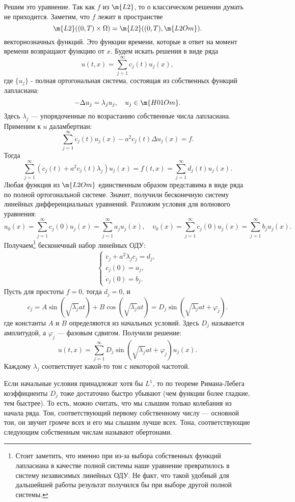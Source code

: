 Решим это уравнение. Так как $f$ из $\m{L2}$, то о классическом решении думать не приходится. Заметим, что $f$ лежит в пространстве
$$ \m{L2}((0,T) \times \Omega) = \m{L2}((0,T) , \m{L2Om}).$$
векторнозначных функций. Это функции времени, которые в ответ на момент времени возвращают функцию от $x$. Будем искать решения в виде ряда
$$ u(t,x) = \sum_{j=1}^\infty c_j (t) u_j(x),$$
где $\{ u_j \}$ - полная ортогональная система, состоящая из собственных функций лапласиана:
$$ - \Delta u_j = \lambda_j u_j, \quad u_j \in \m{H01Om}.$$
Здесь ${\lambda_j}$ --- упорядоченные по возрастанию собственные числа лапласиана. Применим к $u$ даламбертиан:
$$ \sum_{j=1}^\infty \ddot{c}_j(t) u_j(x) - a^2 c_j(t) \Delta u_j(x) = f.$$
Тогда
$$ \sum_{j=1}^\infty \left( \ddot{c}_j(t) + a^2 c_j(t) \lambda_j \right) u_j(x) = f (t,x) = \sum_{j=1}^\infty d_j(t) u_j(x).$$
Любая функция из $\m{L2Om}$ единственным образом представима в виде ряда по полной ортогональной системе. Значит, получили бесконечную систему линейных дифференциальных уравнений. Разложим условия для волнового уравнения:
$$ u_0(x) = \sum_{j=1}^\infty c_j(0) u_j(x) = \sum_{j=1}^\infty a_j u_j(x), \quad  v_0(x) = \sum_{j=1}^\infty \dot{c}_j(0) u_j(x) = \sum_{j=1}^\infty b_j u_j(x).$$
Получаем\footnote{Стоит заметить, что именно при из-за выбора собственных функций лапласиана в качестве полной системы наше уравнение превратилось в систему независимых линейных ОДУ. Не факт, что такой удобный для дальшейшей работы результат получился бы при выборе другой полной системы.} бесконечный набор линейных ОДУ: 
\begin{align*}
	\begin{cases*}
		\ddot{c}_j + a^2 \lambda_j c_j = d_j,\\
		c_j(0) = a_j,\\
		\dot{c}_j(0) = b_j.
	\end{cases*}
\end{align*}
Пусть для простоты $f = 0$, тогда $d_j = 0$, и
$$ c_j = A \sin (\sqrt{\lambda_j} a t) + B \cos (\sqrt{\lambda_j} a t) = D_j \sin (\sqrt{\lambda_j} at + \varphi_j).$$
где константы $A$ и $B$ определяются из начальных условий. Здесь $D_j$ называется амплитудой, а $\varphi_j$ --- фазовым сдвигом. Получили решение:
$$ u (t,x) = \sum_{j=1}^\infty D_j \sin (\sqrt{\lambda_j} at + \varphi_j) u_j(x).$$
Каждому $\lambda_j$ соответствует какой-то тон с некоторой частотой.

\begin{note}
Если начальные условия принадлежат хотя бы $L^1$, то по теореме Римана-Лебега коэффициенты $D_j$ тоже достаточно быстро убывают (чем функции более гладкие, тем быстрее). То есть, можно считать, что мы слышим только колебания из начала ряда. Тон, соответствующий первому собственному числу --- основной тон, он звучит громче всех и его мы слышим лучше всех. Тона, соответствующие следующим собственным числам называют обертонами.
\end{note}

